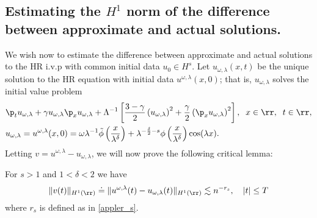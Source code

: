 \subsection{Estimating the $H^1$ norm of the difference 
between approximate and actual
	solutions.}
	We wish now to estimate the difference between approximate and actual solutions to
	the HR i.v.p with common initial data $u_0 \in H^s$. Let
	$u_{\omega,\lambda}(x,t)$ be the unique solution to the HR equation
	with initial data $u^{\omega,\lambda}(x,0)$; that is,
	$u_{\omega,\lambda}$ solves the initial value problem
	\begin{align}
		& \p_t u_{\omega,\lambda} + \gamma u_{\omega,\lambda} \p_x u_{\omega,\lambda} + \Lambda^{-1} \left[
		\frac{3- \gamma}{2}\left( u_{\omega,\lambda} \right)^2 + \frac{\gamma}{2}\left(
		\p_x u_{\omega,\lambda} \right)^2
		\right], \; \; x\in \rr, \; \; t \in \rr,
		\label{apple50}
		\\
		& u_{\omega,\lambda} = u^{\omega,\lambda}(x,0)=\omega \lambda^{-1}
		\tilde{\phi} \left( \frac{x}{\lambda^\delta} \right)
		+ \lambda^{-\frac{\delta}{2} -s}
		\phi\left( \frac{x}{\lambda^\delta} \right) \cos(\lambda x).
		\label{apple41}
	\end{align}
%
%
Letting $v = u^{\omega,\lambda} - u_{\omega,\lambda}$, we will now prove the following critical lemma:
\begin{lemma}
	\label{applelem:bound_for_difference-of-approx-and-actual-soln}
	For $s > 1$ and $1<\delta<2$ we have 
			\begin{equation} 
				\|
				v(t)
				\|_{H^1(\rr)}
				\doteq
				\label{applediffer-H1-est} 
				\|
				u^{\omega,\lambda}(t) 
				- 
				u_{\omega,\lambda}(t)
				\|_{H^1(\rr)}
				\lesssim 
				n^{-r_s}, 
				\quad
				|t| \le T
			\end{equation}
			where $r_s$ is defined as in \eqref{appler_s}.
			\end{lemma}
